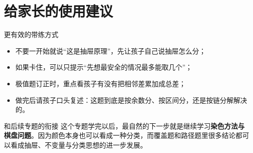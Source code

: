 \documentclass[11pt,a4paper,fontset=fandol]{ctexart}
\begin{document}
\section{给家长的使用建议}

\begin{warnbox}{更有效的带练方式}
\begin{itemize}
  \item 不要一开始就说“这是抽屉原理”，先让孩子自己说抽屉怎么分；
  \item 如果卡住，可以只提示“先想最安全的情况最多能取几个”；
  \item 极值题订正时，重点看孩子有没有把相邻差累加成总差；
  \item 做完后请孩子口头复述：这题到底是按余数分、按区间分，还是按链分解解决的。
\end{itemize}
\end{warnbox}

\begin{infobox}{和后续专题的衔接}
这个专题学完以后，最自然的下一步就是继续学习\textbf{染色方法与棋盘问题}。因为颜色本身也可以看成一种分类，而覆盖题和路径题里很多结论都可以看成抽屉、不变量与分类思想的进一步发展。
\end{infobox}
\end{document}
